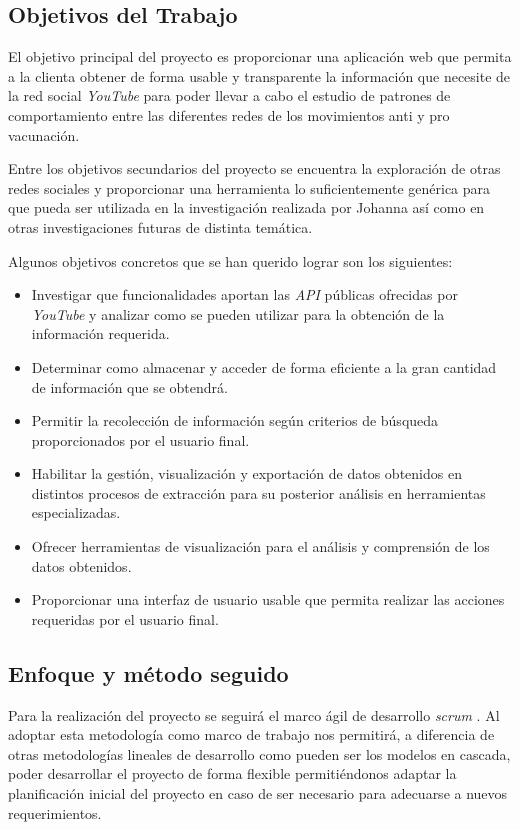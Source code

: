 \documentclass[11pt,a4paper]{article}
\begin{document}
\subsection{Objetivos del Trabajo}
El objetivo principal del proyecto es proporcionar una aplicación web que permita a la clienta obtener de forma usable y transparente la información que necesite de la red social \textit{YouTube} para poder llevar a cabo el estudio de patrones de comportamiento entre las diferentes redes de los movimientos anti y pro vacunación.
\linebreak

Entre los objetivos secundarios del proyecto se encuentra la exploración de otras redes sociales y proporcionar una herramienta lo suficientemente genérica para que pueda ser utilizada en la investigación realizada por Johanna así como en otras investigaciones futuras de distinta temática.
\linebreak

Algunos objetivos concretos que se han querido lograr son los siguientes: 
\begin{itemize}
\item Investigar que funcionalidades aportan las \textit{API} públicas ofrecidas por \textit{YouTube} y analizar como se pueden utilizar para la obtención de la información requerida.
\item Determinar como almacenar y acceder de forma eficiente a la gran cantidad de información que se obtendrá.
\item Permitir la recolección de información según criterios de búsqueda proporcionados por el usuario final.
\item Habilitar la gestión, visualización y exportación de datos obtenidos en distintos procesos de extracción para su posterior análisis en herramientas especializadas.
\item Ofrecer herramientas de visualización para el análisis y comprensión de los datos obtenidos.
\item Proporcionar una interfaz de usuario usable que permita realizar las acciones requeridas por el usuario final.
\end{itemize}


\subsection{Enfoque y método seguido}
Para la realización del proyecto se seguirá el marco ágil de desarrollo \textit{scrum} \cite{8}. Al adoptar esta metodología como marco de trabajo nos permitirá, a diferencia de otras metodologías lineales de desarrollo como pueden ser los modelos en cascada, poder desarrollar el proyecto de forma flexible permitiéndonos adaptar la planificación inicial del proyecto en caso de ser necesario para adecuarse a nuevos requerimientos.
\end{document}
